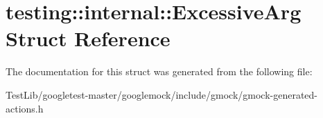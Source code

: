 \hypertarget{structtesting_1_1internal_1_1ExcessiveArg}{}\section{testing\+:\+:internal\+:\+:Excessive\+Arg Struct Reference}
\label{structtesting_1_1internal_1_1ExcessiveArg}


The documentation for this struct was generated from the following file\+:\begin{DoxyCompactItemize}
\item 
Test\+Lib/googletest-\/master/googlemock/include/gmock/gmock-\/generated-\/actions.\+h\end{DoxyCompactItemize}

